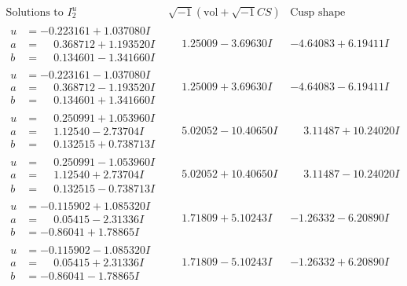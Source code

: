 \documentclass[1p]{elsarticle_modified}
\theoremstyle{definition}
\newcommand{\I}{\sqrt{-1}}
\begin{document}
$$\begin{array}{c|c|c}  
\text{Solutions to }I^u_{2}& \I (\text{vol} + \sqrt{-1}CS) & \text{Cusp shape}\\
 \hline 
\begin{aligned}
u &= -0.223161 + 1.037080 I \\
a &= \phantom{-}0.368712 + 1.193520 I \\
b &= \phantom{-}0.134601 - 1.341660 I\end{aligned}
 & \phantom{-}1.25009 - 3.69630 I & -4.64083 + 6.19411 I \\ \hline\begin{aligned}
u &= -0.223161 - 1.037080 I \\
a &= \phantom{-}0.368712 - 1.193520 I \\
b &= \phantom{-}0.134601 + 1.341660 I\end{aligned}
 & \phantom{-}1.25009 + 3.69630 I & -4.64083 - 6.19411 I \\ \hline\begin{aligned}
u &= \phantom{-}0.250991 + 1.053960 I \\
a &= \phantom{-}1.12540 - 2.73704 I \\
b &= \phantom{-}0.132515 + 0.738713 I\end{aligned}
 & \phantom{-}5.02052 - 10.40650 I & \phantom{-}3.11487 + 10.24020 I \\ \hline\begin{aligned}
u &= \phantom{-}0.250991 - 1.053960 I \\
a &= \phantom{-}1.12540 + 2.73704 I \\
b &= \phantom{-}0.132515 - 0.738713 I\end{aligned}
 & \phantom{-}5.02052 + 10.40650 I & \phantom{-}3.11487 - 10.24020 I \\ \hline\begin{aligned}
u &= -0.115902 + 1.085320 I \\
a &= \phantom{-}0.05415 - 2.31336 I \\
b &= -0.86041 + 1.78865 I\end{aligned}
 & \phantom{-}1.71809 + 5.10243 I & -1.26332 - 6.20890 I \\ \hline\begin{aligned}
u &= -0.115902 - 1.085320 I \\
a &= \phantom{-}0.05415 + 2.31336 I \\
b &= -0.86041 - 1.78865 I\end{aligned}
 & \phantom{-}1.71809 - 5.10243 I & -1.26332 + 6.20890 I \\ \hline\begin{aligned}

\end{aligned}
\end{array}$$
\end{document}
